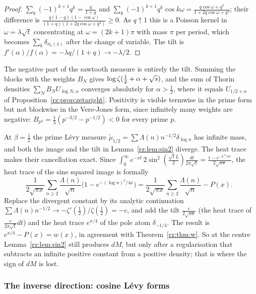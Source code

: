 \begin{proof}
$\sum_k(-1)^{k+1}q^k=\frac q{1+q}$ and $\sum_k(-1)^{k+1}q^k\cos k\omega=\frac{q\cos\omega+q^2}{1+2q\cos\omega+q^2}$; their difference is $\frac{q(1-q)(1-\cos\omega)}{(1+q)(1+2q\cos\omega+q^2)}\ge0$. As $q\uparrow1$ this is a Poisson kernel in $\omega=\lambda\sqrt t$ concentrating at $\omega=(2k+1)\pi$ with mass $\pi$ per period, which becomes $\sum_k\delta_{\sigma_k(\lambda)}$ after the change of variable. The tilt is $f'(\alpha)/f(\alpha)=-\lambda q/(1+q)\to-\lambda/2$.
\end{proof}

The negative part of the sawtooth measure is entirely the tilt. Summing the blocks with the weights $B_N$ gives $\log\zeta(\frac12+\alpha+\sqrt{s})$, and the sum of Thorin densities $\sum_NB_NU_{\log N,\alpha}$ converges absolutely for $\alpha>\frac12$, where it equals $U_{1/2+\alpha}$ of Proposition~\ref{rz:prop:zetaright}. Positivity is visible termwise in the prime form but not blockwise in the Vere-Jones form, since infinitely many weights are negative: $B_{p^3}=\frac13(p^{-3/2}-p^{-1/2})<0$ for every prime $p$.

At $\beta=\frac12$ the prime L\'evy measure $\tilde\mu_{1/2}=\sum\Lambda(n)n^{-1/2}\delta_{\log n}$ has infinite mass, and both the image and the tilt in Lemma~\ref{rz:lem:sin2} diverge. The heat trace makes their cancellation exact. Since $\int_0^\infty e^{-xt}\,2\sin^2(\frac{\sqrt t L}2)\frac{dt}{2\pi\sqrt t}=\frac{1-e^{-L^2/4x}}{2\sqrt{\pi x}}$, the heat trace of the sine squared image is formally
\[
\frac{1}{2\sqrt{\pi x}}\sum_{n\ge2}\frac{\Lambda(n)}{\sqrt n}\bigl(1-e^{-(\log n)^2/4x}\bigr)=\frac{1}{2\sqrt{\pi x}}\sum_{n\ge2}\frac{\Lambda(n)}{\sqrt n}-P(x).
\]
Replace the divergent constant by its analytic continuation $\sum\Lambda(n)n^{-1/2}\to-\zeta'(\frac12)/\zeta(\frac12)=-c$, and add the tilt $\frac{c}{2\sqrt{\pi x}}$ (the heat trace of $\frac{c}{2\pi\sqrt t}dt$) and the heat trace $e^{x/4}$ of the pole atom $\delta_{-1/4}$. The result is $e^{x/4}-P(x)=w(x)$, in agreement with Theorem~\ref{rz:thm:w}. So at the centre Lemma~\ref{rz:lem:sin2} still produces $dM$, but only after a regularisation that subtracts an infinite positive constant from a positive density; that is where the sign of $dM$ is lost.

\subsubsection{The inverse direction: cosine L\'evy forms}

